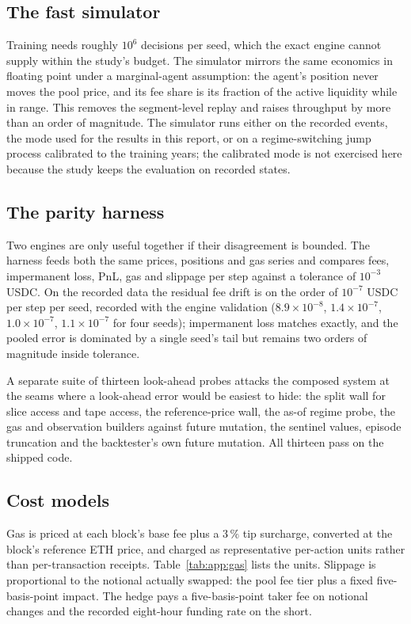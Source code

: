 \subsection{The fast simulator}

Training needs roughly $10^6$ decisions per seed, which the exact engine
cannot supply within the study's budget. The simulator mirrors the same
economics in floating point under a marginal-agent assumption: the agent's
position never moves the pool price, and its fee share is its fraction of the
active liquidity while in range. This removes the segment-level replay and
raises throughput by more than an order of magnitude. The simulator runs either
on the recorded events, the mode used for the results in this report, or on a
regime-switching jump process calibrated to the training years; the calibrated
mode is not exercised here because the study keeps the evaluation on recorded
states.

\subsection{The parity harness}

Two engines are only useful together if their disagreement is bounded. The
harness feeds both the same prices, positions and gas series and compares fees,
impermanent loss, PnL, gas and slippage per step against a tolerance of
$10^{-3}$ USDC. On the recorded data the residual fee drift is on the order of
$10^{-7}$ USDC per step per seed, recorded with the engine validation
($8.9\times10^{-8}$, $1.4\times10^{-7}$, $1.0\times10^{-7}$,
$1.1\times10^{-7}$ for four seeds); impermanent loss matches exactly, and the
pooled error is dominated by a single seed's tail but remains two orders of
magnitude inside tolerance.

A separate suite of thirteen look-ahead probes attacks the composed system at
the seams where a look-ahead error would be easiest to hide: the split wall for
slice access and tape access, the reference-price wall, the as-of regime
probe, the gas and observation builders against future mutation, the sentinel
values, episode truncation and the backtester's own future mutation. All
thirteen pass on the shipped code.

\subsection{Cost models}

Gas is priced at each block's base fee plus a $3\,\%$ tip surcharge, converted
at the block's reference ETH price, and charged as representative per-action
units rather than per-transaction receipts. Table~\ref{tab:app:gas} lists the
units. Slippage is proportional to the notional actually swapped: the pool fee
tier plus a fixed five-basis-point impact. The hedge pays a five-basis-point
taker fee on notional changes and the recorded eight-hour funding rate on the
short.

